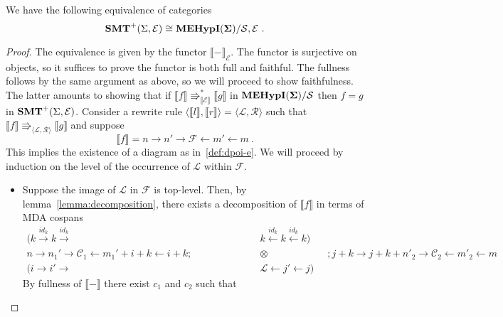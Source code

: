 \begin{theorem}
We have the following equivalence of categories
\[
	\textbf{SMT}^{+}(\Sigma, \mathcal {E} ) \cong {\mathbf{MEHypI(\Sigma)}} / \mathcal{S,E}~.
\]
\end{theorem}
\begin{proof}
The equivalence is given by the functor $\llbracket - \rrbracket_{\mathcal{E}}$.
The functor is surjective on objects,  so it suffices to prove the functor is both full and faithful.
The fullness follows by the same argument as above, so we will proceed to show faithfulness.
The latter amounts to showing that if $\llbracket f \rrbracket \Rrightarrow_{\llbracket \mathcal{E} \rrbracket}^{*} \llbracket g \rrbracket$ in ${\mathbf{MEHypI(\Sigma)}} / \mathcal{S}$ then $f = g$ in $\mathbf{SMT}^{+}(\Sigma,\mathcal{E})$.
Consider a rewrite rule $\langle \llbracket l \rrbracket, \llbracket r \rrbracket \rangle = \langle \mathcal{L}, \mathcal{R} \rangle$ such that $\llbracket f \rrbracket \Rrightarrow_{\langle \mathcal{L}, \mathcal{R} \rangle} \llbracket g \rrbracket$ and suppose
\[
	\llbracket f \rrbracket = n \xrightarrow{} n' \xrightarrow{} \mathcal{F} \xleftarrow{} m' \xleftarrow{} m ~.
\]
This implies the existence of a diagram as in~\ref{def:dpoi-e}.
We will proceed by induction on the level of the occurrence of $\mathcal{L}$ within $\mathcal{F}$.
\begin{itemize}
	\item Suppose the image of $\mathcal{L}$ in $\mathcal{F}$ is top-level.
		  Then, by lemma~\ref{lemma:decomposition}, there exists a decomposition of $\llbracket f \rrbracket$ in terms of MDA cospans
		\begin{align*}
			(k \xrightarrow{id_{k}} k \xrightarrow{id_{k}} &k \xleftarrow{id_{k}} k \xleftarrow{id_{k}} k)\\
			n \xrightarrow{} n_{1}' \xrightarrow{} \mathcal{C}_{1} \xleftarrow{} m_{1}' + i + k \xleftarrow{} i + k; \qquad\qquad\qquad &\otimes \qquad\qquad\qquad ; j + k \xrightarrow{} j + k + n'_{2} \xrightarrow{} \mathcal{C}_{2} \xleftarrow{} m'_{2} \xleftarrow{} m\\
			(i \xrightarrow{} i' \xrightarrow{} &\mathcal{L} \xleftarrow{} j' \xleftarrow{} j)
		\end{align*}
		By fullness of $\llbracket - \rrbracket$ there exist $c_{1}$ and $c_{2}$ such that 

\end{itemize}
\end{proof}
